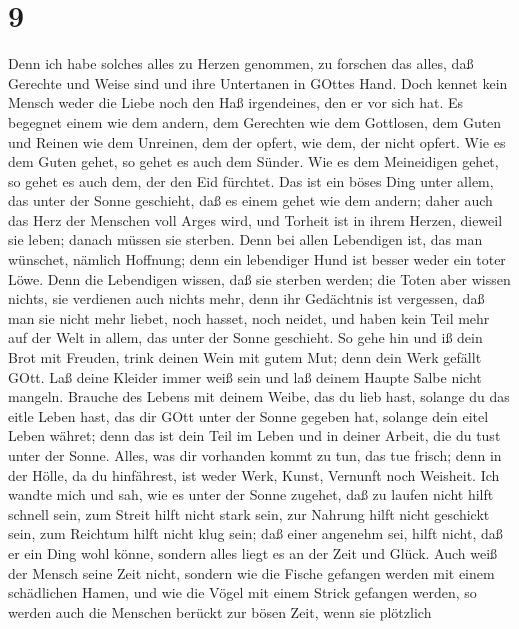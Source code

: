 \hypertarget{section-8}{%
\section{9}\label{section-8}}

 Denn ich habe solches alles zu Herzen genommen, zu forschen
das alles, daß Gerechte und Weise sind und ihre Untertanen in GOttes
Hand. Doch kennet kein Mensch weder die Liebe noch den Haß irgendeines,
den er vor sich hat.  Es begegnet einem wie dem andern, dem
Gerechten wie dem Gottlosen, dem Guten und Reinen wie dem Unreinen, dem
der opfert, wie dem, der nicht opfert. Wie es dem Guten gehet, so gehet
es auch dem Sünder. Wie es dem Meineidigen gehet, so gehet es auch dem,
der den Eid fürchtet.  Das ist ein böses Ding unter allem,
das unter der Sonne geschieht, daß es einem gehet wie dem andern; daher
auch das Herz der Menschen voll Arges wird, und Torheit ist in ihrem
Herzen, dieweil sie leben; danach müssen sie sterben.  Denn
bei allen Lebendigen ist, das man wünschet, nämlich Hoffnung; denn ein
lebendiger Hund ist besser weder ein toter Löwe.  Denn die
Lebendigen wissen, daß sie sterben werden; die Toten aber wissen nichts,
sie verdienen auch nichts mehr, denn ihr Gedächtnis ist vergessen,
 daß man sie nicht mehr liebet, noch hasset, noch neidet,
und haben kein Teil mehr auf der Welt in allem, das unter der Sonne
geschieht.  So gehe hin und iß dein Brot mit Freuden, trink
deinen Wein mit gutem Mut; denn dein Werk gefällt GOtt.  Laß
deine Kleider immer weiß sein und laß deinem Haupte Salbe nicht mangeln.
 Brauche des Lebens mit deinem Weibe, das du lieb hast,
solange du das eitle Leben hast, das dir GOtt unter der Sonne gegeben
hat, solange dein eitel Leben währet; denn das ist dein Teil im Leben
und in deiner Arbeit, die du tust unter der Sonne.  Alles,
was dir vorhanden kommt zu tun, das tue frisch; denn in der Hölle, da du
hinfährest, ist weder Werk, Kunst, Vernunft noch Weisheit. 
Ich wandte mich und sah, wie es unter der Sonne zugehet, daß zu laufen
nicht hilft schnell sein, zum Streit hilft nicht stark sein, zur Nahrung
hilft nicht geschickt sein, zum Reichtum hilft nicht klug sein; daß
einer angenehm sei, hilft nicht, daß er ein Ding wohl könne, sondern
alles liegt es an der Zeit und Glück.  Auch weiß der Mensch
seine Zeit nicht, sondern wie die Fische gefangen werden mit einem
schädlichen Hamen, und wie die Vögel mit einem Strick gefangen werden,
so werden auch die Menschen berückt zur bösen Zeit, wenn sie plötzlich
